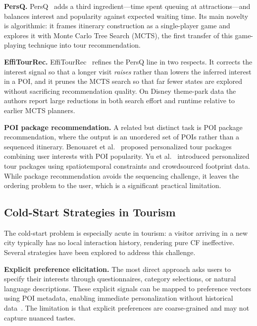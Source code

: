 \textbf{PersQ.} PersQ~\cite{lim2017persq} adds a third ingredient---time spent queuing at attractions---and balances interest and popularity against expected waiting time. Its main novelty is algorithmic: it frames itinerary construction as a single-player game and explores it with Monte Carlo Tree Search (MCTS), the first transfer of this game-playing technique into tour recommendation.

\textbf{EffiTourRec.} EffiTourRec~\cite{halder2022effitour} refines the PersQ line in two respects. It corrects the interest signal so that a longer visit \emph{raises} rather than lowers the inferred interest in a POI, and it prunes the MCTS search so that far fewer states are explored without sacrificing recommendation quality. On Disney theme-park data the authors report large reductions in both search effort and runtime relative to earlier MCTS planners.

\textbf{POI package recommendation.} A related but distinct task is POI package recommendation, where the output is an unordered set of POIs rather than a sequenced itinerary. Benouaret et al.~\cite{benouaret2017package} proposed personalized tour packages combining user interests with POI popularity. Yu et al.~\cite{yu2016package} introduced personalized tour packages using spatiotemporal constraints and crowdsourced footprint data. While package recommendation avoids the sequencing challenge, it leaves the ordering problem to the user, which is a significant practical limitation.

\subsection{Cold-Start Strategies in Tourism}
\label{sec:sota-pers-coldstart}

The cold-start problem is especially acute in tourism: a visitor arriving in a new city typically has no local interaction history, rendering pure CF ineffective. Several strategies have been explored to address this challenge.

\textbf{Explicit preference elicitation.} The most direct approach asks users to specify their interests through questionnaires, category selections, or natural language descriptions. These explicit signals can be mapped to preference vectors using POI metadata, enabling immediate personalization without historical data~\cite{burke2002hybrid}. The limitation is that explicit preferences are coarse-grained and may not capture nuanced tastes.


